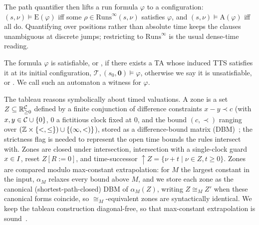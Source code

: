 %
%
The path quantifier then lifts a run formula $\varphi$ to a configuration: $(s,\nu)\models\mathrm{E}(\varphi)$ iff
{some} $\rho\in\mathrm{Runs}^\infty(s,\nu)$ satisfies $\varphi$, and $(s,\nu)\models\mathrm{A}(\varphi)$ iff
{all} do. Quantifying over positions rather than absolute time keeps the clauses unambiguous at discrete
jumps; restricting to $\mathrm{Runs}^\infty$ is the usual dense-time reading.%



The formula $\varphi$ is {satisfiable}, or \SAT, if there exists a TA whose induced TTS satisfies it at its initial configuration, $\mathcal{T},(s_0,\mathbf{0})\models\varphi$, otherwise we say it is {unsatisfiable}, or \UNSAT. We call such an automaton a {witness} for $\varphi$.


The tableau reasons symbolically about timed valuations. A {zone} is a set
$Z\subseteq\mathbb{R}_{\ge0}^{\mathcal{C}}$ defined by a finite conjunction of difference constraints
$x-y\prec c$ (with $x,y\in\mathcal{C}\cup\{0\}$, $0$ a fictitious clock fixed at $0$, and the bound
$(c,\prec)$ ranging over $(\mathbb{Z}\times\{<,\le\})\cup\{(\infty,<)\}$), stored as a difference-bound matrix
(DBM)~\cite{AlurDill1994,Bouyer05TimedAutomata}; the strictness flag is needed to represent the open time
bounds the rules intersect with. Zones are closed under intersection, intersection with a single-clock guard
$x\in I$, reset $Z[R:=0]$, and {time-successor} $\uparrow Z=\{\nu+t\mid\nu\in Z,t\ge0\}$. Zones are compared modulo max-constant extrapolation: for $M$ the largest constant in the
input, $\alpha_M$ relaxes every bound above $M$, and we store each zone as the canonical
(shortest-path-closed) DBM of $\alpha_M(Z)$, writing $Z\cong_M Z'$ when these canonical forms coincide, so
$\cong_M$-equivalent zones are syntactically identical. We keep the tableau construction diagonal-free, so that max-constant extrapolation is sound~\cite{Bouyer05TimedAutomata}.

%
%
%